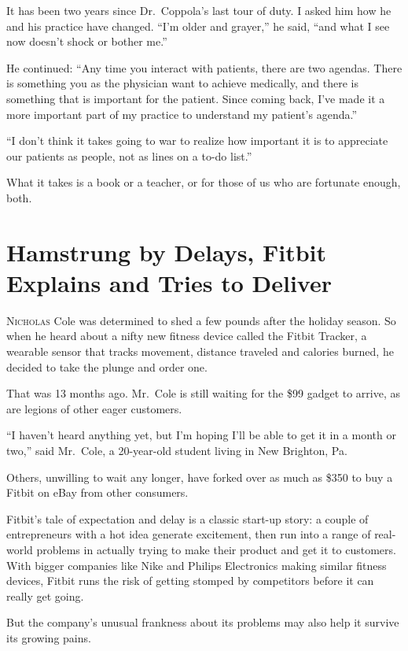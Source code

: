﻿\documentclass[12pt]{article}
\begin{document}
It has been two years since Dr.~Coppola's last tour of duty. I asked him how he and his practice
have changed. ``I'm older and grayer,'' he said, ``and what I see now doesn't shock or bother me.''

He continued: ``Any time you interact with patients, there are two agendas. There is something you
as the physician want to achieve medically, and there is something that is important for the
patient. Since coming back, I've made it a more important part of my practice to understand my
patient's agenda.''

``I don't think it takes going to war to realize how important it is to appreciate our patients as
people, not as lines on a to-do list.''

What it takes is a book or a teacher, or for those of us who are fortunate enough, both.

\section{Hamstrung by Delays, Fitbit Explains and Tries to Deliver}

\lettrine{N}{icholas} Cole was determined to shed a few pounds after the
holiday season. So when he heard about a nifty new fitness device called the Fitbit Tracker, a
wearable sensor that tracks movement, distance traveled and calories burned, he decided to take the
plunge and order one.

That was 13 months ago. Mr.~Cole is still waiting for the \$99 gadget to arrive, as are legions of
other eager customers.

``I haven't heard anything yet, but I'm hoping I'll be able to get it in a month or two,'' said
Mr.~Cole, a 20-year-old student living in New Brighton, Pa.

Others, unwilling to wait any longer, have forked over as much as \$350 to buy a Fitbit on eBay from
other consumers.

Fitbit's tale of expectation and delay is a classic start-up story: a couple of entrepreneurs with a
hot idea generate excitement, then run into a range of real-world problems in actually trying to
make their product and get it to customers. With bigger companies like Nike and Philips Electronics
making similar fitness devices, Fitbit runs the risk of getting stomped by competitors before it can
really get going.

But the company's unusual frankness about its problems may also help it survive its growing pains.
\end{document}
